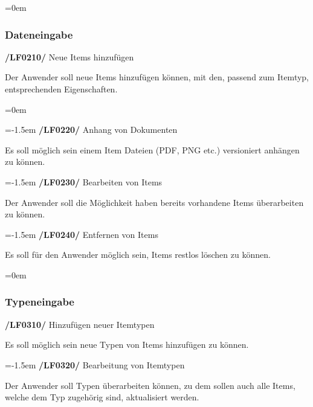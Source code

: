 \documentclass[11pt,a4paper]{report}
\begin{document}
\leftskip=0em
\subsubsection{Dateneingabe}
\textbf{/LF0210/} Neue Items hinzufügen
\par
\begingroup
\leftskip=1cm
\noindent Der Anwender soll neue Items hinzufügen können, mit den, passend zum Itemtyp, entsprechenden Eigenschaften.\\
\par
\endgroup

\leftskip=0em

\leftskip=-1.5em
\textbf{/LF0220/} Anhang von Dokumenten
\par
\begingroup
\leftskip=1cm
\noindent Es soll möglich sein einem Item Dateien (PDF, PNG etc.) versioniert anhängen zu können.\\
\par
\endgroup

\leftskip=-1.5em
\textbf{/LF0230/} Bearbeiten von Items
\par
\begingroup
\leftskip=1cm
\noindent Der Anwender soll die Möglichkeit haben bereits vorhandene Items überarbeiten zu können.\\
\par
\endgroup

\leftskip=-1.5em
\textbf{/LF0240/} Entfernen von Items
\par
\begingroup
\leftskip=1cm
\noindent Es soll für den Anwender möglich sein, Items restlos löschen zu können.\\
\par
\endgroup

\leftskip=0em
\subsubsection{Typeneingabe}

\textbf{/LF0310/} Hinzufügen neuer Itemtypen
\par
\begingroup
\leftskip=1cm
\noindent Es soll möglich sein neue Typen von Items hinzufügen zu können.\\
\par
\endgroup

\leftskip=-1.5em
\textbf{/LF0320/} Bearbeitung von Itemtypen
\par
\begingroup
\leftskip=1cm
\noindent Der Anwender soll Typen überarbeiten können, zu dem sollen auch alle Items, welche dem Typ zugehörig sind, aktualisiert werden.\\
\par
\endgroup
\end{document}
